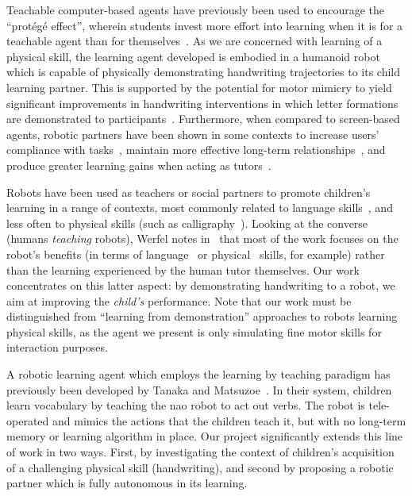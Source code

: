 \documentclass{sig-alternate}
\begin{document}
Teachable computer-based agents have previously been used to encourage the
``protégé effect'', wherein students invest more effort into learning when it is
for a teachable agent than for themselves~\cite{Chase2009}.  As we are concerned
with learning of a physical skill, the learning agent developed is embodied in a
humanoid robot which is capable of physically demonstrating handwriting
trajectories to its child learning partner.  This is supported by the potential
for motor mimicry to yield significant improvements in handwriting interventions
in which letter formations are demonstrated to
participants~\cite{Berninger1997}. Furthermore, when compared to screen-based
agents, robotic partners have been shown in some contexts to increase users'
compliance with tasks~\cite{Bainbridge2011}, maintain more effective long-term
relationships~\cite{Kidd2008}, and produce greater learning gains when acting as
tutors~\cite{Leyzberg2012}.

Robots have been used as teachers or social partners to promote children's
learning in a range of contexts, most commonly related to language
skills~\cite{Han2010}, and less often to physical skills (such as
calligraphy~\cite{Matsui2013}).  Looking at the converse (humans \emph{teaching}
robots), Werfel notes in~\cite{Werfel2014} that most of the work focuses on the
robot's benefits (in terms of language~\cite{Saunders2010} or
physical~\cite{Mulling2013} skills, for example) rather than the learning
experienced by the human tutor themselves.  Our work concentrates on this latter
aspect: by demonstrating handwriting to a robot, we aim at improving the
\emph{child's} performance. Note that our work must be distinguished from
``learning from demonstration'' approaches to robots learning physical skills,
as the agent we present is only simulating fine motor skills for interaction
purposes.

A robotic learning agent which employs the learning by teaching paradigm has
previously been developed by Tanaka and Matsuzoe~\cite{Tanaka2012}. In their
system, children learn vocabulary by teaching the {\sc nao} robot to act out
verbs. The robot is tele-operated and mimics the actions that the children teach
it, but with no long-term memory or learning algorithm in place.  Our project
significantly extends this line of work in two ways. First, by investigating the
context of children's acquisition of a challenging physical skill (handwriting),
and second by proposing a robotic partner which is fully autonomous in its
learning.
\end{document}
